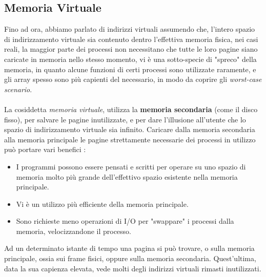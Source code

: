 \documentclass[12pt, letterpaper]{article}
\newcommand{\acc}{\\\hphantom{}\\}
\begin{document}
\subsection{Memoria Virtuale}
Fino ad ora, abbiamo parlato di indirizzi virtuali assumendo che, l'intero spazio di indirizzamento virtuale sia 
contenuto dentro l'effettiva memoria fisica, nei casi reali, la maggior parte dei processi non necessitano che tutte 
le loro pagine siano caricate in memoria nello stesso momento, vi è una sotto-specie di "spreco" della memoria, in quanto 
alcune funzioni di certi processi sono utilizzate raramente, e gli array spesso sono più capienti del necessario, in modo 
da coprire gli \textit{worst-case scenario}.\acc  La cosiddetta \textit{memoria virtuale}, utilizza la \textbf{memoria 
secondaria} (come il disco fisso), per salvare le pagine inutilizzate, e per dare l'illusione all'utente che lo spazio 
di indirizzamento virtuale sia infinito. Caricare dalla memoria secondaria alla memoria principale le pagine 
strettamente necessarie dei processi in utilizzo può portare vari benefici : \begin{itemize}
    \item I programmi possono essere pensati e scritti per operare su uno spazio di memoria molto più grande 
    dell'effettivo spazio esistente nella memoria principale.
    \item Vi è un utilizzo più efficiente della memoria principale.
    \item Sono richieste meno operazioni di I/O per "swappare" i processi dalla memoria, velocizzandone il processo.
\end{itemize}
Ad un determinato istante di tempo una pagina si può trovare, o sulla memoria principale, ossia sui frame fisici, oppure 
sulla memoria secondaria. Quest'ultima, data la sua capienza elevata, vede molti degli indirizzi virtuali 
rimasti inutilizzati.
\end{document}
